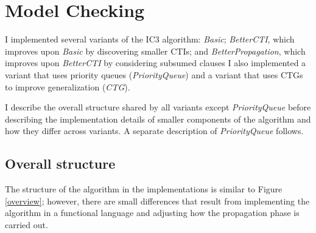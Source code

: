 \documentclass[12pt,a4paper,twoside,openright]{report}
\begin{document}
{{\section{Model Checking}
\label{impl:modelchecker}

I implemented several variants of the IC3 algorithm:
\emph{Basic}; \emph{BetterCTI}, which improves upon \emph{Basic} by discovering
smaller CTIs; and \emph{BetterPropagation}, which improves upon \emph{BetterCTI}
by considering subsumed clauses
I also implemented a variant that uses priority queues (\emph{PriorityQueue})
and a variant that uses CTGs to improve generalization (\emph{CTG}).

I describe the overall structure shared by all variants except
\emph{PriorityQueue} before describing the implementation
details of smaller components of the algorithm and how they differ across
variants. A separate description of \emph{PriorityQueue}
follows.

\subsection{Overall structure}

The structure of the algorithm in the implementations is similar
to Figure \ref{overview}; however, there are
small differences that result from implementing the algorithm in a
functional language and adjusting how the propagation phase is
carried out.

}}
\end{document}
